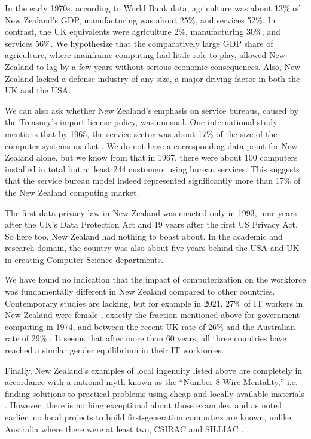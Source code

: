 \documentclass{IEEEcsmag}
\begin{document}
In the early 1970s, according to World Bank data, agriculture was about 13\% of New Zealand’s GDP, manufacturing
was about 25\%, and services 52\%. In contrast, the UK equivalents were agriculture 2\%, manufacturing 30\%,
and services 56\%. We hypothesize that the comparatively large GDP share of agriculture, where mainframe computing had
little role to play, allowed New Zealand to lag by a few years without serious economic consequences. Also, New Zealand lacked a defense industry of any size, a major driving factor in both the UK and the USA.

We can also ask whether New Zealand’s emphasis on service bureaus, caused by the Treasury’s import
license policy, was unusual.  One international study mentions that by 1965, the service sector was about 17\% of the
size of the computer systems market \cite{Campbell-Kelly-2008}. We do not have a corresponding data point for
New Zealand alone, but we know from \cite{ScottSurvey1967} that in 1967, there were about 100 computers
installed in total but at least 244 customers using bureau services. This suggests that the service bureau
model indeed represented significantly more than 17\% of the New Zealand computing market.

The first data privacy law in New Zealand was enacted only in 1993, nine years
after the UK’s Data Protection Act and 19 years after the first US Privacy Act. So here too,
New Zealand had nothing to boast about. In the academic and research domain, the country was
also about five years behind the USA and UK in creating Computer Science departments.

We have found no indication that the impact of computerization on the workforce was fundamentally
different in New Zealand compared to other countries. Contemporary studies are lacking, but for example
in 2021, 27\% of IT workers in New Zealand were female \cite{NZTIA-2022}, exactly the fraction mentioned above
for government computing in 1974, and between the recent UK rate of 26\% \cite{WISE-2023}
and the Australian rate of 29\% \cite{Deloitte-2022}. It seems that after more than 60 years,
all three countries have reached a similar gender equilibrium in their IT workforces.

Finally, New Zealand’s examples of local ingenuity listed above are completely in accordance
with a national myth known as the “Number 8 Wire Mentality,” i.e. finding solutions to practical
problems using cheap and locally available materials \cite{NZPOD, ingenuity}. However, there is nothing
exceptional about those examples, and as noted earlier, no local projects to build first-generation
computers are known, unlike Australia where there were at least two, CSIRAC and SILLIAC \cite{Philipson-2017}.
\end{document}
